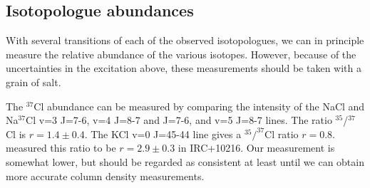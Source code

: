 \documentclass[twocolumn]{aastex62}
\newcommand{\bam}[1]{\textcolor{green!65!black}{\textbf{[BAM: #1]}}}
\newcommand{\ag}[1]{\textcolor{red!65!black}{\textbf{[AG: #1]}}}
\begin{document}

%

\subsection{Isotopologue abundances}
With several transitions of each of the observed isotopologues, we can in
principle measure the relative abundance of the various isotopes.  However,
because of the uncertainties in the excitation above, these measurements should
be taken with a grain of salt.

The $^{37}$Cl abundance can be measured by comparing the intensity of the
NaCl and Na$^{37}$Cl v=3 J=7-6, v=4 J=8-7 and J=7-6, and v=5 J=8-7 lines.
The ratio $^{35}$/$^{37}$Cl is $r=1.4\pm0.4$.  The KCl v=0 J=45-44 line
gives a $^{35}/^{37}$Cl ratio $r=0.8$.  \citet{Agundez2012a} measured
this ratio to be $r=2.9\pm0.3$ in IRC+10216.  Our measurement is somewhat lower,
but should be regarded as consistent at least until we can obtain more
accurate column density measurements.
\end{document}
